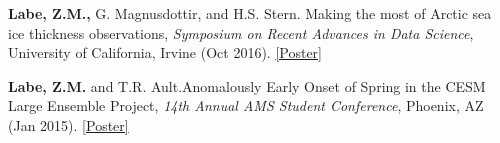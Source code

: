 \documentclass[margin,line,palatino,courier,10pt]{res}
\begin{document}
\begin{resume}
\begin{etaremune}[leftmargin=0in,topsep=0in,parsep=0in]
\item \textbf{Labe, Z.M.,} G. Magnusdottir, and H.S. Stern. Making the most of Arctic sea ice thickness observations, \textit{Symposium on Recent Advances in Data Science}, University of California, Irvine (Oct 2016). \href{https://zacklabe.files.wordpress.com/2022/08/c4b1e-zlabemagnusdottirstern_dsiposter_oct16.pdf}{[Poster]}
\item \textbf{Labe, Z.M.} and T.R. Ault.\@ Anomalously Early Onset of Spring in the CESM Large Ensemble Project, \textit{14th Annual AMS Student Conference}, Phoenix, AZ (Jan 2015). \href{https://ams.confex.com/ams/95Annual/webprogram/Paper271063.html}{[Poster]}

\end{etaremune}


\end{resume}
\end{document}
